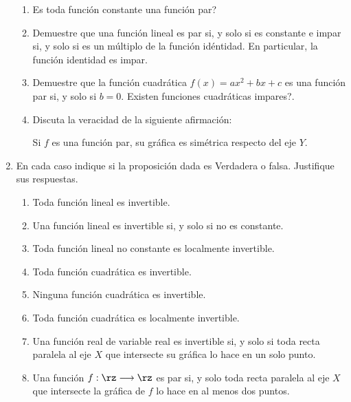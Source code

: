 \begin{enumerate}
\begin{enumerate}
\item \textquestiondown Es toda funci\'{o}n constante una funci\'{o}n par?

\item Demuestre que una funci\'{o}n lineal es par si, y solo si es constante e
impar si, y solo si es un m\'{u}ltiplo de la funci\'{o}n id\'{e}ntidad. En
particular, la funci\'{o}n identidad es impar.

\item Demuestre que la funci\'{o}n cuadr\'{a}tica $f(x)=ax^{2}+bx+c$ es una
funci\'{o}n par si, y solo si $b=0$. \textquestiondown Existen funciones
cuadr\'{a}ticas impares?.

\item Discuta la veracidad de la siguiente afirmaci\'{o}n:

Si $f$ es una funci\'{o}n par, su gr\'{a}fica es sim\'{e}trica respecto del
eje $Y$.
\end{enumerate}

\item En cada caso indique si la proposici\'{o}n dada es Verdadera o falsa.
Justifique sus respuestas.

\begin{enumerate}
\item Toda funci\'{o}n lineal es invertible.

\item Una funci\'{o}n lineal es invertible si, y solo si no es constante.

\item Toda funci\'{o}n lineal no constante es localmente invertible.

\item Toda funci\'{o}n cuadr\'{a}tica es invertible.

\item Ninguna funci\'{o}n cuadr\'{a}tica es invertible.

\item Toda funci\'{o}n cuadr\'{a}tica es localmente invertible.

\item Una funci\'{o}n real de variable real es invertible si, y solo si toda
recta paralela al eje $X$ que intersecte su gr\'{a}fica lo hace en un solo punto.

\item Una funci\'{o}n $f:\rz\longrightarrow\rz$ es par si, y solo toda recta
paralela al eje $X$ que intersecte la gr\'{a}fica de $f$ lo hace en al menos
dos puntos.
\end{enumerate}


\end{enumerate}
